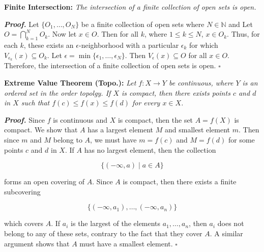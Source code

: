 \documentclass[12pt, a4paper]{article}
\begin{document}
\par

\textbf{Finite Intersection:} \textit{The intersection of a finite collection of open sets is open.}

\begin{description}
    \item\textit{\textbf{Proof.}} Let $\{O_1, \dots, O_N\}$ be a finite collection of open sets where $N\in\mathbb{N}$ and Let $O=\bigcap_{k=1}^{N} O_k$. Now let $x\in O$. Then for all $k$, where $1\leq k\leq N$, $x\in O_k$. Thus, for each $k$, these exists an $\epsilon$-neighborhood with a particular $\epsilon_k$ for which $V_{\epsilon_k}(x)\subseteq O_k$. Let $\epsilon=\min\{\epsilon_1,\dots,\epsilon_N\}$. Then $V_{\epsilon}(x)\subseteq O$ for all $x\in O$. Therefore, the intersection of a finite collection of open sets is open. $\square$
\end{description}

\vspace{4mm}\par

\textbf{Extreme Value Theorem (Topo.):} \textit{ Let $f\colon X\rightarrow Y$ be continuous, where $Y$ is an ordered set in the order topolgy. If $X$ is compact, then there exists points $c$ and $d$ in $X$ such that $f(c)\leq f(x)\leq f(d)$ for every $x\in X$.}

\begin{description}
    \item\textit{\textbf{Proof.}} Since $f$ is continuous and $X$ is compact, then the set $A=f(X)$ is compact. We show that $A$ has a largest element $M$ and smallest element $m$. Then since $m$ and $M$ belong to $A$, we must have $m=f(c)$ and $M=f(d)$ for some points $c$ and $d$ in $X$. If $A$ has no largest element, then the collection
    
    \begin{equation*}
        \{(-\infty, a)\mid a\in A\}
    \end{equation*}
    
    forms an open covering of $A$. Since $A$ is compact, then there exists a finite subcovering 
    
    \begin{equation*}
        \{(-\infty, a_1),\dots,(-\infty, a_n)\}
    \end{equation*}
    
    which covers $A$. If $a_i$ is the largest of the elements $a_1,\dots, a_n$, then $a_i$ does not belong to any of these sets, contrary to the fact that they cover $A$. A similar argument shows that $A$ must have a smallest element. $\square$
\end{description}
\end{document}
